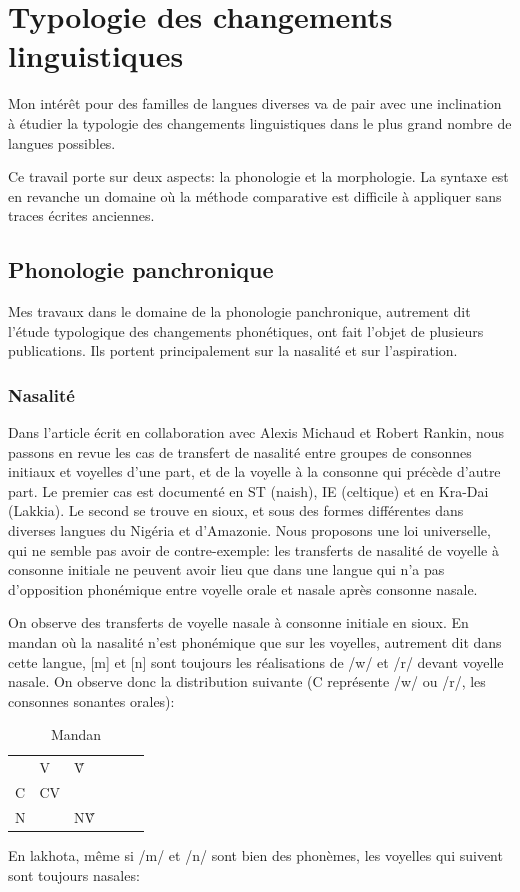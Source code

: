 \documentclass[oldfontcommands,oneside,a4paper,11pt]{memoir}
\begin{document}
\chapter{Typologie des changements linguistiques}

Mon intérêt pour des familles de langues diverses  va de pair avec une inclination à étudier la typologie des changements linguistiques dans le plus grand nombre de langues possibles.

Ce travail porte sur deux aspects: la phonologie et la morphologie. La syntaxe est en revanche un domaine où la méthode comparative est difficile à appliquer sans traces écrites anciennes.


\section{Phonologie panchronique} \label{sec:panchrp}
Mes travaux dans le domaine de la phonologie panchronique, autrement dit l'étude typologique des changements phonétiques, ont fait l'objet de plusieurs publications. Ils portent principalement sur la nasalité et sur l'aspiration.

\subsection{Nasalité}
Dans l'article \citet{michaud-jacques12nasalite} écrit en collaboration avec Alexis Michaud et Robert Rankin,  nous passons en revue les cas de transfert de nasalité entre groupes de consonnes initiaux et voyelles d'une part, et de la voyelle à la consonne qui précède d'autre part. Le premier cas est documenté en ST (naish), IE (celtique) et en Kra-Dai (Lakkia). Le second se trouve en sioux, et sous des formes différentes dans diverses langues du Nigéria et d'Amazonie. Nous proposons une loi universelle, qui ne semble pas avoir de contre-exemple: les transferts de nasalité de voyelle à consonne initiale ne peuvent avoir lieu que dans une langue qui n'a pas d'opposition phonémique entre voyelle orale et nasale après consonne nasale.

On  observe des transferts de voyelle nasale à consonne initiale en sioux. En mandan où la nasalité n'est phonémique que sur les voyelles, autrement dit dans cette langue, [m] et [n] sont toujours les réalisations de /w/ et /r/ devant voyelle nasale. On observe donc la distribution suivante (C représente  /w/ ou /r/, les consonnes sonantes orales):


\begin{table}[h]
\caption{Mandan}
\centering
\begin{tabular}{llllll}  \toprule
& V & Ṽ \\
C &  CV &\\
N & & NṼ\\
\bottomrule
\end{tabular}
\end{table}
En lakhota, même si /m/ et /n/ sont bien des phonèmes, les voyelles qui suivent sont toujours nasales:
\end{document}
